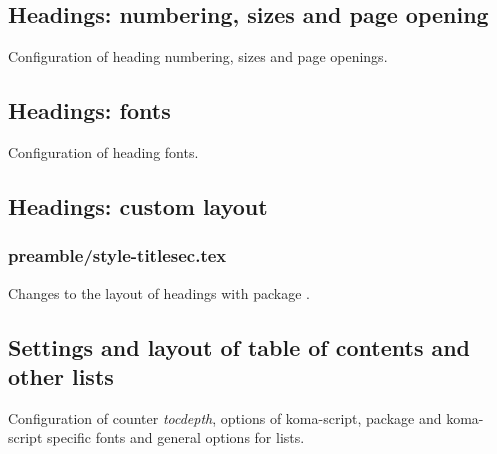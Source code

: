 \subsection{Headings: numbering, sizes and page opening}

Configuration of heading numbering, sizes and page openings.


\subsection{Headings: fonts}

Configuration of heading fonts.


\subsection{Headings: custom layout}


\subsubsection{preamble/style-titlesec.tex}

Changes to the layout of headings with package . 


\subsection{Settings and layout of table of contents and other lists}

Configuration of counter \emph{tocdepth}, options of koma-script, package  and koma-script specific fonts and general options for lists.



